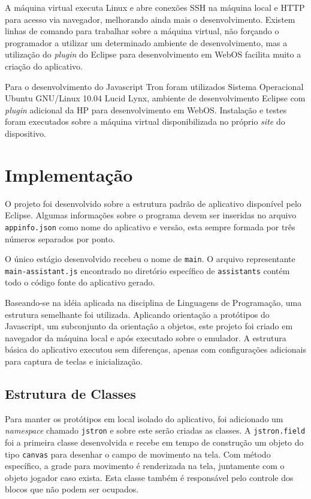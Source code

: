 \documentclass{article}
\begin{document}
A máquina virtual executa Linux e abre conexões SSH na máquina local e HTTP para
acesso via navegador, melhorando ainda mais o desenvolvimento. Existem linhas de
comando para trabalhar sobre a máquina virtual, não forçando o programador a
utilizar um determinado ambiente de desenvolvimento, mas a utilização do
\emph{plugin} do Eclipse para desenvolvimento em WebOS facilita muito a criação
do aplicativo.

Para o desenvolvimento do Javascript Tron foram utilizados Sistema Operacional
Ubuntu GNU/Linux 10.04 Lucid Lynx, ambiente de desenvolvimento Eclipse com
\emph{plugin} adicional da HP para desenvolvimento em WebOS. Instalação e testes
foram executados sobre a máquina virtual disponibilizada no próprio \emph{site}
do dispositivo.

\section{Implementação}
\label{sec:implementacao}

O projeto foi desenvolvido sobre a estrutura padrão de aplicativo disponível
pelo Eclipse. Algumas informações sobre o programa devem ser inseridas no
arquivo \texttt{appinfo.json} como nome do aplicativo e versão, esta sempre
formada por três números separados por ponto.

O único estágio desenvolvido recebeu o nome de \texttt{main}. O arquivo
representante \texttt{main-assistant.js} encontrado no diretório específico de
\texttt{assistants} contém todo o código fonte do aplicativo gerado.

Baseando-se na idéia aplicada na disciplina de Linguagens de Programação, uma
estrutura semelhante foi utilizada. Aplicando orientação a protótipos do
Javascript, um subconjunto da orientação a objetos, este projeto foi criado em
navegador da máquina local e após executado sobre o emulador. A estrutura básica
do aplicativo executou sem diferenças, apenas com configurações adicionais para
captura de teclas e inicialização.

\subsection{Estrutura de Classes}

Para manter os protótipos em local isolado do aplicativo, foi adicionado um
\emph{namespace} chamado \texttt{jstron} e sobre este serão criadas as classes.
A \texttt{jstron.field} foi a primeira classe desenvolvida e recebe em tempo de
construção um objeto do tipo \texttt{canvas} para desenhar o campo de movimento
na tela. Com método específico, a grade para movimento é renderizada na tela,
juntamente com o objeto jogador caso exista. Esta classe também é responsável
pelo controle dos blocos que não podem ser ocupados.
\end{document}
